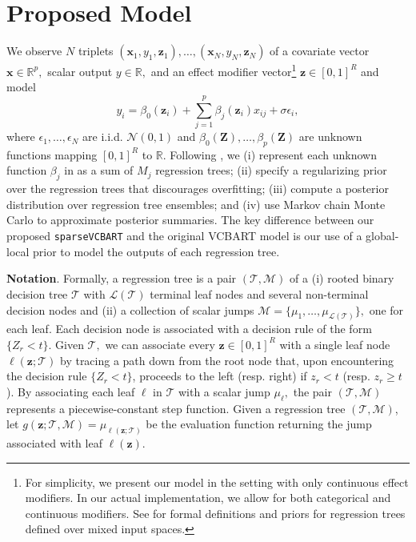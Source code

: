 \documentclass[11pt]{article}
\newcommand{\R}{\mathbb{R}} %
\newcommand{\calL}{\mathcal{L}}
\newcommand{\calM}{\mathcal{M}}
\newcommand{\calT}{\mathcal{T}}
\newcommand{\normaldist}[2]{\mathcal{N}\left(#1,#2\right)} %
\newcommand{\bx}{\bm{x}}
\newcommand{\bz}{\bm{z}}
\newcommand{\bZ}{\bm{Z}}
\theoremstyle{plain}
\theoremstyle{definition}
\theoremstyle{plain}
\begin{document}
\section{Proposed Model}
\label{sec:model}
We observe $N$ triplets $(\bx_{1}, y_{1}, \bz_{1}), \ldots, (\bx_{N}, y_{N}, \bz_{N})$ of a covariate vector $\bx \in \R^{p},$ scalar output $y \in \R,$ and an effect modifier vector\footnote{For simplicity, we present our model in the setting with only continuous effect modifiers. In our actual implementation, we allow for both categorical and continuous modifiers. See \citet{Deshpande2025} for formal definitions and priors for regression trees defined over mixed input spaces.} $\bz \in [0,1]^{R}$ and model
\begin{equation}
\label{eq:vcmodel}
y_{i} = \beta_{0}(\bz_{i}) + \sum_{j = 1}^{p}{\beta_{j}(\bz_{i})x_{ij}} + \sigma \epsilon_{i},
\end{equation}
where $\epsilon_{1}, \ldots, \epsilon_{N}$ are i.i.d. $\normaldist{0}{1}$ and $\beta_{0}(\bZ), \ldots, \beta_{p}(\bZ)$ are unknown functions mapping $[0,1]^{R}$ to $\R.$
Following \citet{Deshpande2024}, we (i) represent each unknown function $\beta_{j}$ in  as a sum of $M_{j}$ regression trees; (ii) specify a regularizing prior over the regression trees that discourages overfitting; (iii) compute a posterior distribution over regression tree ensembles; and (iv) use Markov chain Monte Carlo to approximate posterior summaries.
The key difference between our proposed \texttt{sparseVCBART} and the original VCBART model is our use of a global-local prior to model the outputs of each regression tree.

\textbf{Notation}.
Formally, a regression tree is a pair $(\calT, \calM)$ of a (i) rooted binary decision tree $\calT$ with $\calL(\calT)$ terminal leaf nodes and several non-terminal decision nodes and (ii) a collection of scalar jumps $\calM = \{\mu_{1}, \ldots, \mu_{\calL(\calT)}\},$ one for each leaf.
Each decision node is associated with a decision rule of the form $\{Z_{r} < t\}.$
Given $\calT,$ we can associate every $\bz \in [0,1]^{R}$ with a single leaf node $\ell(\bz; \calT)$ by tracing a path down from the root node that, upon encountering the decision rule $\{Z_{r} < t\}$, proceeds to the left (resp. right) if $z_{r} < t$ (resp. $z_{r} \geq t$). 
By associating each leaf $\ell$ in $\calT$ with a scalar jump $\mu_{\ell},$ the pair $(\calT, \calM)$ represents a piecewise-constant step function.
Given a regression tree $(\calT, \calM)$, let $g(\bz; \calT, \calM) = \mu_{\ell(\bz; \calT)}$ be the evaluation function returning the jump associated with leaf $\ell(\bz).$
\end{document}
